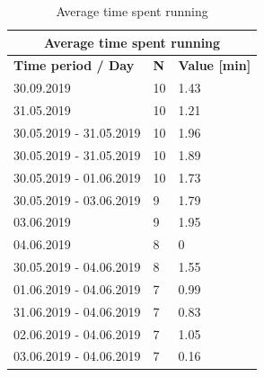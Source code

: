 \begin{table}[]
\begin{tabular}{|l|l|l|}
\hline
\multicolumn{3}{|c|}{\textbf{Average time spent running}}          \\ \hline
\textbf{Time period / Day} & \textbf{N} & \textbf{Value {[}min{]}} \\ \hline
30.09.2019                 & 10         & 1.43                     \\ \hline
31.05.2019                 & 10         & 1.21                     \\ \hline
30.05.2019 - 31.05.2019    & 10         & 1.96                     \\ \hline
30.05.2019 - 31.05.2019    & 10         & 1.89                     \\ \hline
30.05.2019 - 01.06.2019    & 10         & 1.73                     \\ \hline
30.05.2019 - 03.06.2019    & 9          & 1.79                     \\ \hline
03.06.2019                 & 9          & 1.95                     \\ \hline
04.06.2019                 & 8          & 0                        \\ \hline
30.05.2019 - 04.06.2019    & 8          & 1.55                     \\ \hline
01.06.2019 - 04.06.2019    & 7          & 0.99                     \\ \hline
31.06.2019 - 04.06.2019    & 7          & 0.83                     \\ \hline
02.06.2019 - 04.06.2019    & 7          & 1.05                     \\ \hline
03.06.2019 - 04.06.2019    & 7          & 0.16                     \\ \hline
\end{tabular}
\label{results-running}
\caption{Average time spent running}
\end{table}

